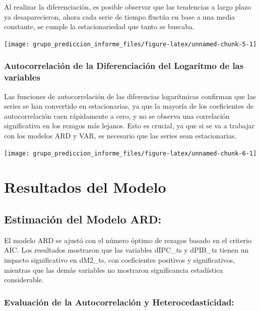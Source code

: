 \documentclass[
  12pt,
]{article}
\begin{document}
Al realizar la diferenciación, es posible observar que las tendencias a
largo plazo ya desaparecieron, ahora cada serie de tiempo fluctúa en
base a una media constante, se cumple la estacionariedad que tanto se
buscaba.

\begin{center}\texttt{[image: grupo\_prediccion\_informe\_files/figure-latex/unnamed-chunk-5-1]} \end{center}

\subsubsection{Autocorrelación de la Diferenciación del Logaritmo de las
variables}\label{autocorrelaciuxf3n-de-la-diferenciaciuxf3n-del-logaritmo-de-las-variables}

Las funciones de autocorrelación de las diferencias logarítmicas
confirman que las series se han convertido en estacionarias, ya que la
mayoría de los coeficientes de autocorrelación caen rápidamente a cero,
y no se observa una correlación significativa en los rezagos más
lejanos. Esto es crucial, ya que si se va a trabajar con los modelos ARD
y VAR, es necesario que las series sean estacionarias.

\begin{center}\texttt{[image: grupo\_prediccion\_informe\_files/figure-latex/unnamed-chunk-6-1]} \end{center}

\section{Resultados del Modelo}\label{resultados-del-modelo}

\subsection{Estimación del Modelo
ARD:}\label{estimaciuxf3n-del-modelo-ard}

El modelo ARD se ajustó con el número óptimo de rezagos basado en el
criterio AIC. Los resultados mostraron que las variables dIPC\_ts y
dPIB\_ts tienen un impacto significativo en dM2\_ts, con coeficientes
positivos y significativos, mientras que las demás variables no
mostraron significancia estadística considerable.

\subsubsection{Evaluación de la Autocorrelación y
Heterocedasticidad:}\label{evaluaciuxf3n-de-la-autocorrelaciuxf3n-y-heterocedasticidad}
\end{document}
